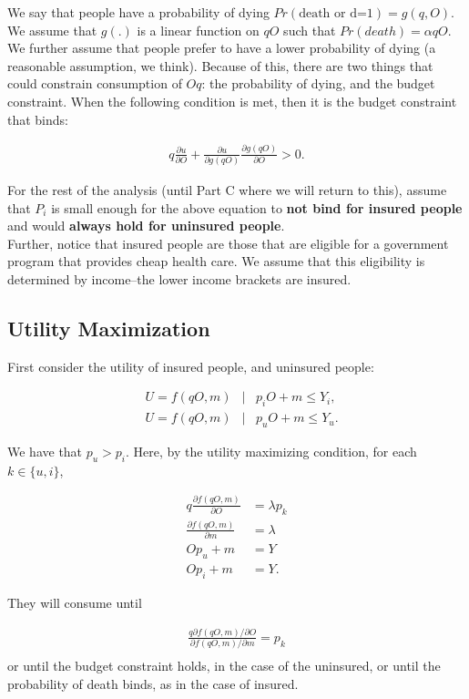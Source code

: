 \documentclass{article}
\begin{document}
We say that people have a probability of dying $Pr(\text{death or d=1}) = g(q,O).$  We assume that $g(.)$ is a linear function on $qO$ such that $Pr(death) = \alpha qO$. We further assume that people prefer to have a lower probability of dying (a reasonable assumption, we think). Because of this, there are two things that could constrain consumption of $Oq$: the probability of dying, and the budget constraint. When the following condition is met, then it is the budget constraint that binds:

\begin{align*}
    q\frac{\partial u}{\partial O}+\frac{\partial u}{\partial g(qO)} \frac{\partial g(qO)}{\partial O}>0.
\end{align*}

For the rest of the analysis (until Part C where we will return to this), assume that $P_i$ is small enough for the above equation to \textbf{not bind for insured people} and would \textbf{always hold for uninsured people}.\\

Further, notice that insured people are those that are eligible for a government program that provides cheap health care. We assume that this eligibility is determined by income--the lower income brackets are insured.

\subsection*{Utility Maximization}

First consider the utility of insured people, and uninsured people:

\begin{align}
   & U = f(qO,m) &|& p_iO + m \leq Y_i,\\
   & U = f(qO,m) &|& p_uO + m \leq Y_u.
\end{align}

We have that $p_u > p_i$. Here, by the utility maximizing condition, for each $k\in \{u,i\}$,

\begin{align*}
   q\frac{\partial f(qO,m)}{\partial O} &= \lambda p_k \\
   \frac{\partial f(qO,m)}{\partial m} &= \lambda \\
   O p_u +m &= Y\\
   O p_i + m &= Y.
\end{align*}

They will consume until 

\begin{align*}
   \frac{q\partial f(qO,m)/\partial O}{\partial f(qO,m)/\partial m} = p_k \\
\end{align*}
or until the budget constraint holds, in the case of the uninsured, or until the probability of death binds, as in the case of insured. 
\end{document}
